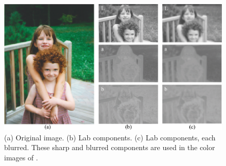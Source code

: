 \begin{figure}
\centerline{
\includegraphics[width=1.0\linewidth]{figures/color/nonblur_lab_girls.eps}
}
\caption{(a) Original image.  (b) Lab components.  (c) Lab components,
  each blurred.   These sharp and blurred components are used  in the color images of \fig{\ref{fig:girls4}}.
}
\label{fig:girls3}
\end{figure}



